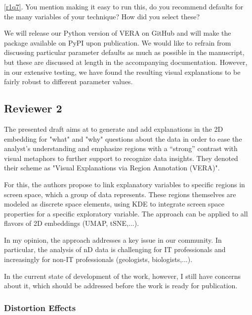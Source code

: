 \documentclass{article}
\newcounter{rtaskno}
\newcommand{\rtask}[1]{\refstepcounter{rtaskno}\label{#1}}
\newcommand{\reviewc}[2]{\begin{leftbar}\noindent\rtask{#1}\ref{#1}. #2\end{leftbar}}
\newcommand{\review}[1]{\begin{leftbar}\noindent #1\end{leftbar}}
\newcommand{\answer}[1]{\noindent #1\\[0mm]}
\newlength{\leftbarwidth}
\newlength{\leftbarsep}
\renewenvironment{leftbar}{%
    \def\FrameCommand{{\color{black}{\vrule width \leftbarwidth\relax\hspace {\leftbarsep}}}}%
    \MakeFramed {\advance \hsize -\width \FrameRestore }%
}{\endMakeFramed}
\begin{document}
\reviewc{r1q7}{You mention making it easy to run this, do you recommend defaults for the many variables of your technique? How did you select these?}

\answer{We will release our Python version of VERA on GitHub and will make the package available on PyPI upon publication. We would like to refrain from discussing particular parameter defaults as much as possible in the manuscript, but these are discussed at length in the accompanying documentation. However, in our extensive testing, we have found the resulting visual explanations to be fairly robust to different parameter values.}


\subsection*{Reviewer 2}

\review{
The presented draft aims at to generate and add explanations in the 2D embedding for "what" and "why" questions about the data in order to ease the analyst's understanding and emphasize regions with a “strong” contrast with visual metaphors to further support to recognize data insights. They denoted their scheme as "Visual Explanations via Region Annotation (VERA)".

For this, the authors propose to link explanatory variables to specific regions in screen space, which a group of data represents. These regions themselves are modeled as discrete space elements, using KDE to integrate screen space properties for a specific exploratory variable. The approach can be applied to all flavors of 2D embeddings (UMAP, tSNE,...).

In my opinion, the approach addresses a key issue in our community. In particular, the analysis of nD data is challenging for IT professionals and increasingly for non-IT professionals (geologists, biologists,...).

In the current state of development of the work, however, I still have concerns about it, which should be addressed before the work is ready for publication.
}

\subsubsection*{Distortion Effects}
\end{document}
